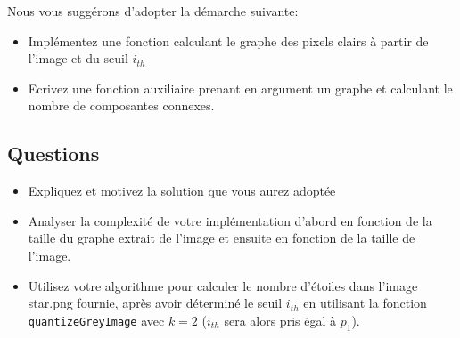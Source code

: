 \documentclass[a4paper,10pt]{article}
\begin{document}
Nous vous suggérons d'adopter la démarche suivante:
\begin{itemize}
\item Implémentez une fonction calculant le graphe des pixels clairs à partir de l'image et du seuil $i_{th}$
\item Ecrivez une fonction auxiliaire prenant en argument un graphe et calculant le nombre de composantes connexes.
\end{itemize}

\subsection*{Questions}

\begin{itemize}
\item Expliquez et motivez la solution que vous aurez adoptée
\item Analyser la complexité de votre implémentation d'abord en fonction de la
  taille du graphe extrait de l'image et ensuite en fonction de la taille de
  l'image.
\item Utilisez votre algorithme pour calculer le nombre d'étoiles dans
  l'image star.png fournie, après avoir déterminé le seuil $i_{th}$ en utilisant la fonction \texttt{quantizeGreyImage} avec $k=2$ ($i_{th}$ sera alors pris égal à $p_1$).
\end{itemize}
\end{document}
